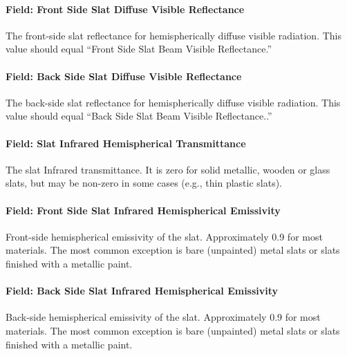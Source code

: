 \paragraph{Field: Front Side Slat Diffuse Visible Reflectance}\label{field-front-side-slat-diffuse-visible-reflectance}

The front-side slat reflectance for hemispherically diffuse visible radiation. This value should equal ``Front Side Slat Beam Visible Reflectance.''

\paragraph{Field: Back Side Slat Diffuse Visible Reflectance}\label{field-back-side-slat-diffuse-visible-reflectance}

The back-side slat reflectance for hemispherically diffuse visible radiation. This value should equal ``Back Side Slat Beam Visible Reflectance..''

\paragraph{Field: Slat Infrared Hemispherical Transmittance}\label{field-slat-infrared-hemispherical-transmittance}

The slat Infrared transmittance. It is zero for solid metallic, wooden or glass slats, but may be non-zero in some cases (e.g., thin plastic slats).

\paragraph{Field: Front Side Slat Infrared Hemispherical Emissivity}\label{field-front-side-slat-infrared-hemispherical-emissivity}

Front-side hemispherical emissivity of the slat. Approximately 0.9 for most materials. The most common exception is bare (unpainted) metal slats or slats finished with a metallic paint.

\paragraph{Field: Back Side Slat Infrared Hemispherical Emissivity}\label{field-back-side-slat-infrared-hemispherical-emissivity}

Back-side hemispherical emissivity of the slat. Approximately 0.9 for most materials. The most common exception is bare (unpainted) metal slats or slats finished with a metallic paint.

